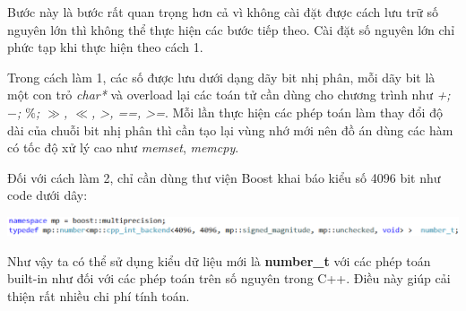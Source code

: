 Bước này là bước rất quan trọng hơn cả vì không cài đặt được cách lưu trữ số nguyên lớn thì không thể thực hiện các bước tiếp theo. Cài đặt số nguyên lớn chỉ phức tạp khi thực hiện theo cách 1.

 Trong cách làm 1, các số được lưu dưới dạng dãy bit nhị phân, mỗi dãy bit là một con trỏ \textit{char*} 
và overload lại các toán tử cần dùng cho chương trình như \textit{+; $-$; $\%$; $\gg$,  $\ll$, >, ==, >=}. Mỗi lần thực hiện các phép toán làm 
thay đổi độ dài của chuỗi bit nhị phân thì cần tạo lại vùng nhớ mới nên đồ án dùng các hàm có tốc độ xử lý cao như \textit{memset}, \textit{memcpy}.

Đối với cách làm 2, chỉ cần dùng thư viện Boost khai báo kiểu số 4096 bit như code dưới dây:

\begin{center}
\includegraphics[width=1\textwidth]{image/number_t.PNG}
\end{center}

Như vậy ta có thể sử dụng kiểu dữ liệu mới là \textbf{number\_t} với các phép toán built-in như đối với các phép toán trên số nguyên trong C++. Điều này giúp cải thiện rất nhiều chi phí tính toán.